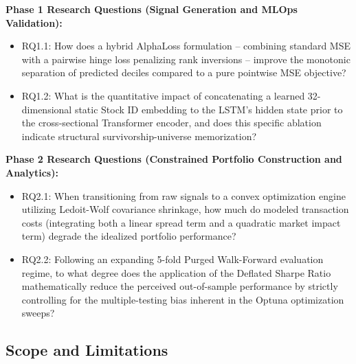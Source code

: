 \textbf{Phase 1 Research Questions (Signal Generation and \acs{MLOps} Validation):}
\begin{itemize}
    \item RQ1.1: How does a hybrid AlphaLoss formulation -- combining standard MSE with a pairwise hinge loss penalizing rank inversions -- improve the monotonic separation of predicted deciles compared to a pure pointwise MSE objective?
    \item RQ1.2: What is the quantitative impact of concatenating a learned 32-dimensional static Stock ID embedding to the LSTM's hidden state prior to the cross-sectional Transformer encoder, and does this specific ablation indicate structural survivorship-universe memorization?
\end{itemize}

\textbf{Phase 2 Research Questions (Constrained Portfolio Construction and Analytics):}
\begin{itemize}
    \item RQ2.1: When transitioning from raw signals to a convex optimization engine utilizing Ledoit-Wolf covariance shrinkage, how much do modeled transaction costs (integrating both a linear spread term and a quadratic market impact term) degrade the idealized portfolio performance?
    \item RQ2.2: Following an expanding 5-fold Purged Walk-Forward evaluation regime, to what degree does the application of the Deflated Sharpe Ratio mathematically reduce the perceived out-of-sample performance by strictly controlling for the multiple-testing bias inherent in the Optuna optimization sweeps?
\end{itemize}

\subsection*{Scope and Limitations}


